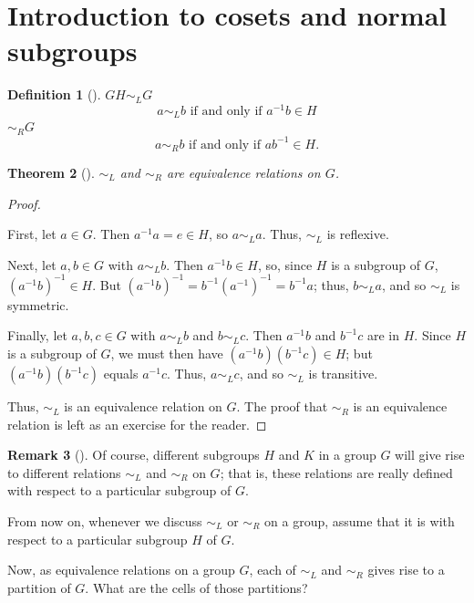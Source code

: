 \documentclass[10pt,]{book}
\theoremstyle{plain}
\newtheorem{theorem}{Theorem}[section]
\theoremstyle{definition}
\newtheorem{definition}[theorem]{Definition}
\theoremstyle{definition}
\newtheorem{remark}[theorem]{Remark}
\theoremstyle{definition}
\theoremstyle{definition}
\numberwithin{equation}{section}
\def\siml{\sim_L}
\def\simr{\sim_R}
\begin{document}
\section[{Introduction to cosets and normal subgroups}]{Introduction to cosets and normal subgroups}\label{section-23}
\begin{definition}[{}]\label{definition-60}
\(G\)\(H\)\(\siml\)\(G\)%
\begin{equation*}
a\siml b \text{ if and only if }
a^{-1}b\in H
\end{equation*}
\(\simr\)\(G\)%
\begin{equation*}
a\simr b \text{ if and only if }
ab^{-1}\in H.
\end{equation*}
\label{notation-34}
\label{notation-35}
\end{definition}
\begin{theorem}[{}]\label{simlreq}
\(\siml\) and \(\simr\) are equivalence relations on \(G\).%
\end{theorem}
\begin{proof}\hypertarget{proof-37}{}
First, let \(a\in G\). Then \(a^{-1}a=e\in H\), so \(a\siml a\). Thus, \(\siml\) is reflexive.%
\par
Next, let \(a,b\in G\) with \(a\siml b\). Then \(a^{-1}b\in H\), so, since \(H\) is a subgroup of \(G\), \((a^{-1}b)^{-1}\in H\). But \((a^{-1}b)^{-1}=b^{-1}(a^{-1})^{-1}=b^{-1}a\); thus, \(b\siml a\), and so \(\siml\) is symmetric.%
\par
Finally, let \(a,b,c\in G\) with \(a\siml b\) and \(b\siml c\). Then \(a^{-1}b\) and \(b^{-1}c\) are in \(H\). Since \(H\) is a subgroup of \(G\), we must then have \((a^{-1}b)(b^{-1}c)\in H\); but \((a^{-1}b)(b^{-1}c)\) equals \(a^{-1}c\). Thus, \(a\siml c\), and so \(\siml\) is transitive.%
\par
Thus, \(\siml\) is an equivalence relation on \(G\). The proof that \(\simr\) is an equivalence relation is left as an exercise for the reader.%
\end{proof}
\begin{remark}[]\label{remark-37}
Of course, different subgroups \(H\) and \(K\) in a group \(G\) will give rise to different relations \(\siml\) and \(\simr\) on \(G\); that is, these relations are really defined  with respect to a particular subgroup of \(G\).%
\end{remark}
From now on, whenever we discuss \(\siml\) or \(\simr\) on a group, assume that it is with respect to a particular subgroup \(H\) of \(G\).%
\par
Now, as equivalence relations on a group \(G\), each of \(\siml\) and \(\simr\) gives rise to a partition of \(G\). What are the cells of those partitions?%
\end{document}
